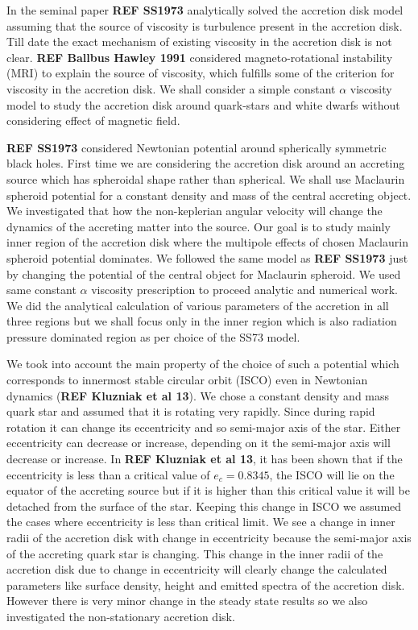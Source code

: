 \documentclass[useAMS,usenatbib]{mn2e}
\newcommand{\mref}[1]{\textbf{REF #1}}
\begin{document}
In the seminal paper \mref{SS1973} analytically solved the accretion disk model assuming that the source of viscosity is turbulence present in the accretion disk. Till date the exact mechanism of existing viscosity in the accretion disk is not clear. \mref{Ballbus Hawley 1991} considered magneto-rotational instability (MRI) to explain the source of viscosity, which fulfills some of the criterion for viscosity in the accretion disk. We shall consider a simple constant $\alpha$ viscosity model to study the accretion disk around quark-stars and white dwarfs without considering effect of magnetic field.

\mref{SS1973} considered Newtonian potential around spherically symmetric black holes. First time we are considering the accretion disk around an accreting source which has spheroidal shape rather than spherical. We shall use Maclaurin spheroid potential for a constant density and mass of the central accreting object. We investigated that how the non-keplerian angular velocity will change the dynamics of the accreting matter into the source. Our goal is to study mainly inner region of the accretion disk where the multipole effects of chosen Maclaurin spheroid potential dominates. We followed the same model as \mref{SS1973} just by changing the potential of the central object for Maclaurin spheroid. We used same constant $\alpha$ viscosity prescription to proceed analytic and numerical work. We did the analytical calculation of various parameters of the accretion in all three regions but we shall focus only in the inner region which is also radiation pressure dominated region as per choice of the SS73 model. 

We took into account the main property of the choice of such a potential which corresponds to innermost stable circular orbit (ISCO) even in Newtonian dynamics (\mref{Kluzniak et al 13}). We chose a constant density and mass quark star and assumed that it is rotating very rapidly. Since during rapid rotation it can change its eccentricity and so semi-major axis of the star. Either eccentricity can decrease or increase, depending on it the semi-major axis will decrease or increase. In \mref{Kluzniak et al 13}, it has been shown that if the eccentricity is less than a critical value of $e_c = 0.8345$, the ISCO will lie on the equator of the accreting source but if it is higher than this critical value it will be detached from the surface of the star. Keeping this change in ISCO we assumed the cases where eccentricity is less than critical limit. We see a change in inner radii of the accretion disk with change in eccentricity because the semi-major axis of the accreting quark star is changing. This change in the inner radii of the accretion disk due to change in eccentricity will clearly change the calculated parameters like surface density, height and emitted spectra of the accretion disk. However there is very minor change in the steady state results so we also investigated the non-stationary accretion disk.
\end{document}
